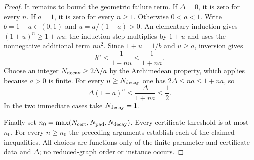\begin{proof}
It remains to bound the geometric failure term. If $\Delta=0$, it is
zero for every $n$. If $a=1$, it is zero for every $n\geq1$.
Otherwise $0<a<1$. Write $b=1-a\in(0,1)$ and
$u=a/(1-a)>0$. An elementary induction gives
$(1+u)^n\geq1+nu$: the induction step multiplies by $1+u$ and
uses the nonnegative additional term $nu^2$.
Since $1+u=1/b$ and $u\geq a$, inversion gives
\[
 b^n\leq\frac1{1+nu}\leq\frac1{1+na}.
\]
Choose an integer $N_{\rm decay}\geq2\Delta/a$ by the Archimedean
property, which applies because $a>0$ is finite. For every
$n\geq N_{\rm decay}$ one has
$2\Delta\leq na\leq1+na$, so
\[
 \Delta(1-a)^n\leq\frac{\Delta}{1+na}\leq\frac12.
\]
In the two immediate cases take $N_{\rm decay}=1$.

Finally set $n_0=\max(N_{\rm cert},N_{\rm pad},N_{\rm decay})$.
Every certificate threshold is at most $n_0$. For every $n\geq n_0$
the preceding arguments establish each of the claimed inequalities.
All choices are functions only of the finite parameter and certificate
data and $\Delta$; no reduced-graph order or instance occurs.
\end{proof}
